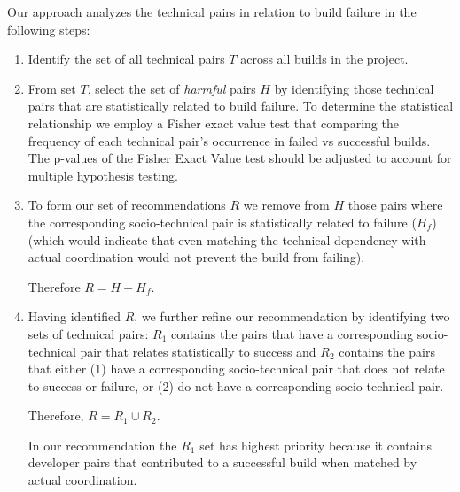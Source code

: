 Our approach analyzes the technical pairs in relation to build failure in the following steps:

\begin{enumerate}
\item Identify the set of all technical pairs $T$ across all builds in the project.

\item From set $T$, select the set of \emph{harmful} pairs $H$ by identifying those technical pairs that are statistically related to build failure. To determine the statistical relationship we employ a Fisher exact value test that comparing the frequency of each technical pair's occurrence in failed vs successful builds. The p-values of the Fisher Exact Value test should be adjusted to account for multiple hypothesis testing.


\item To form our set of recommendations $R$  we remove from $H$ those pairs where the corresponding socio-technical pair is statistically related to failure ($H_f$) (which would indicate that even matching the technical dependency with actual coordination would not prevent the build from failing). 

Therefore $R = H - H_f$.



\item Having identified $R$, we further refine our recommendation by identifying two sets of technical pairs: $R_1$ contains the pairs that have a corresponding socio-technical pair that relates statistically to success and $R_2$ contains the pairs that either (1) have a corresponding socio-technical pair that does not relate to success or failure, or (2) do not have a corresponding socio-technical pair.

Therefore, $R = R_1 \cup R_2$.

In our recommendation the $R_1$ set has highest priority because it contains developer pairs that contributed to a successful build when matched by actual coordination.  



\end{enumerate}

